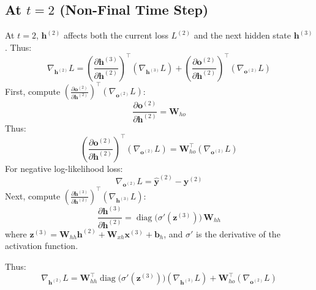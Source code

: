\begin{notechapter}
\subsection{At \(t = 2\) (Non-Final Time Step)}
At \(t = 2\), \(\mathbf{h}^{(2)}\) affects both the current loss \(L^{(2)}\) 
and the next hidden state \(\mathbf{h}^{(3)}\). Thus:
\[
\nabla_{\mathbf{h}^{(2)}} L = 
\left( \frac{\partial \mathbf{h}^{(3)}}{\partial \mathbf{h}^{(2)}} \right)^\top 
\left( \nabla_{\mathbf{h}^{(3)}} L \right) + 
\left( \frac{\partial \mathbf{o}^{(2)}}{\partial \mathbf{h}^{(2)}} \right)^\top 
\left( \nabla_{\mathbf{o}^{(2)}} L \right)
\]
First, compute \(\left( \frac{\partial \mathbf{o}^{(2)}}{\partial \mathbf{h}^{(2)}} \right)^\top 
\left( \nabla_{\mathbf{o}^{(2)}} L \right)\):
\[
\frac{\partial \mathbf{o}^{(2)}}{\partial \mathbf{h}^{(2)}} = \mathbf{W}_{ho}
\]
Thus:
\[
\left( \frac{\partial \mathbf{o}^{(2)}}{\partial \mathbf{h}^{(2)}} \right)^\top 
\left( \nabla_{\mathbf{o}^{(2)}} L \right) = 
\mathbf{W}_{ho}^\top \left( \nabla_{\mathbf{o}^{(2)}} L \right)
\]
For negative log-likelihood loss:
\[
\nabla_{\mathbf{o}^{(2)}} L = \hat{\mathbf{y}}^{(2)} - \mathbf{y}^{(2)}
\]
Next, compute \(\left( \frac{\partial \mathbf{h}^{(3)}}{\partial \mathbf{h}^{(2)}} \right)^\top 
\left( \nabla_{\mathbf{h}^{(3)}} L \right)\):
\[
\frac{\partial \mathbf{h}^{(3)}}{\partial \mathbf{h}^{(2)}} = 
\operatorname{diag}\big(\sigma'(\mathbf{z}^{(3)})\big)\, \mathbf{W}_{hh}
\]
where \(\mathbf{z}^{(3)} = \mathbf{W}_{hh} \mathbf{h}^{(2)} + 
\mathbf{W}_{xh} \mathbf{x}^{(3)} + \mathbf{b}_h\), and \(\sigma'\) is the 
derivative of the activation function.

Thus:
\[
\nabla_{\mathbf{h}^{(2)}} L = 
\mathbf{W}_{hh}^\top \operatorname{diag}\big(\sigma'(\mathbf{z}^{(3)})\big) 
\left( \nabla_{\mathbf{h}^{(3)}} L \right) + 
\mathbf{W}_{ho}^\top \left( \nabla_{\mathbf{o}^{(2)}} L \right)
\]


\end{notechapter}
